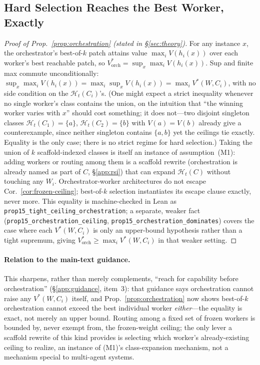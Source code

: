 \subsection{Hard Selection Reaches the Best Worker, Exactly}

\begin{proof}[Proof of Prop.~\ref{prop:orchestration} (stated in \S\ref{sec:theory})]
For any instance $x$, the orchestrator's best-of-$k$ patch attains value $\max_i V(h_i(x))$ over each worker's best reachable patch, so $V^*_{\mathrm{orch}} = \sup_x \max_i V(h_i(x))$. Sup and finite max commute unconditionally: $\sup_x \max_i V(h_i(x)) = \max_i \sup_x V(h_i(x)) = \max_i V^*(W,C_i)$, with no side condition on the $\mathcal{H}_t(C_i)$'s. (One might expect a strict inequality whenever no single worker's class contains the union, on the intuition that ``the winning worker varies with $x$'' should cost something; it does not---two disjoint singleton classes $\mathcal{H}_t(C_1)=\{a\}$, $\mathcal{H}_t(C_2)=\{b\}$ with $V(a)=V(b)$ already give a counterexample, since neither singleton contains $\{a,b\}$ yet the ceilings tie exactly. Equality is the only case; there is no strict regime for hard selection.) Taking the union of $k$ scaffold-indexed classes is itself an instance of assumption~(M1): adding workers or routing among them is a scaffold rewrite (orchestration is already named as part of $C$, \S\ref{app:rsi}) that can expand $\mathcal{H}_t(C)$ without touching any $W_i$. Orchestrator-worker architectures do not escape Cor.~\ref{cor:frozen-ceiling}; best-of-$k$ selection instantiates its escape clause exactly, never more. This equality is machine-checked in Lean as \texttt{prop15\_tight\_ceiling\_orchestration}; a separate, weaker fact (\texttt{prop15\_orchestration\_ceiling}, \texttt{prop15\_orchestration\_dominates}) covers the case where each $V^*(W,C_i)$ is only an upper-bound hypothesis rather than a tight supremum, giving $V^*_{\mathrm{orch}} \ge \max_i V^*(W,C_i)$ in that weaker setting.
\end{proof}

\paragraph{Relation to the main-text guidance.} This sharpens, rather than merely complements, ``reach for capability before orchestration'' (\S\ref{app:guidance}, item~3): that guidance says orchestration cannot raise any $V^*(W,C_i)$ itself, and Prop.~\ref{prop:orchestration} now shows best-of-$k$ orchestration cannot exceed the best individual worker \emph{either}---the equality is exact, not merely an upper bound. Routing among a fixed set of frozen workers is bounded by, never exempt from, the frozen-weight ceiling; the only lever a scaffold rewrite of this kind provides is selecting which worker's already-existing ceiling to realize, an instance of (M1)'s class-expansion mechanism, not a mechanism special to multi-agent systems.


